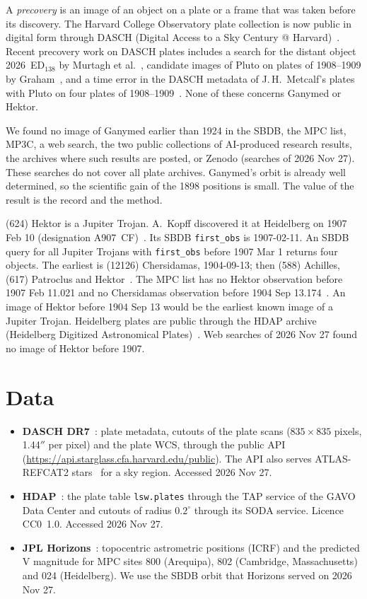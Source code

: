 \documentclass[11pt]{article}
\newcommand{\as}{$''$}
\begin{document}
A \emph{precovery} is an image of an object on a plate or a frame that was taken before its discovery. The Harvard College Observatory plate collection is now public in digital form through DASCH (Digital Access to a Sky Century @ Harvard)~\cite{grindlay2012,dasch}. Recent precovery work on DASCH plates includes a search for the distant object 2026~ED$_{138}$ by Murtagh et al.~\cite{murtagh2026}, candidate images of Pluto on plates of 1908--1909 by Graham~\cite{graham2026}, and a time error in the DASCH metadata of J.\,H.~Metcalf's plates with Pluto on four plates of 1908--1909~\cite{wu2026metcalf}. None of these concerns Ganymed or Hektor.

We found no image of Ganymed earlier than 1924 in the SBDB, the MPC list, MP3C, a web search, the two public collections of AI-produced research results, the archives where such results are posted, or Zenodo (searches of 2026 Nov 27). These searches do not cover all plate archives. Ganymed's orbit is already well determined, so the scientific gain of the 1898 positions is small. The value of the result is the record and the method.

(624) Hektor is a Jupiter Trojan. A.~Kopff discovered it at Heidelberg on 1907 Feb 10 (designation A907~CF)~\cite{sbdb}. Its SBDB \texttt{first\_obs} is 1907-02-11. An SBDB query for all Jupiter Trojans with \texttt{first\_obs} before 1907 Mar 1 returns four objects. The earliest is (12126) Chersidamas, 1904-09-13; then (588) Achilles, (617) Patroclus and Hektor~\cite{sbdb}. The MPC list has no Hektor observation before 1907 Feb 11.021 and no Chersidamas observation before 1904 Sep 13.174~\cite{mpcobs}. An image of Hektor before 1904 Sep 13 would be the earliest known image of a Jupiter Trojan. Heidelberg plates are public through the HDAP archive (Heidelberg Digitized Astronomical Plates)~\cite{hdap}. Web searches of 2026 Nov 27 found no image of Hektor before 1907.

\section{Data}
\begin{itemize}
\item \textbf{DASCH DR7}~\cite{dasch}: plate metadata, cutouts of the plate scans ($835\times835$ pixels, 1.44\as{} per pixel) and the plate WCS, through the public API (\url{https://api.starglass.cfa.harvard.edu/public}). The API also serves ATLAS-REFCAT2 stars~\cite{tonry2018} for a sky region. Accessed 2026 Nov 27.
\item \textbf{HDAP}~\cite{hdap}: the plate table \texttt{lsw.plates} through the TAP service of the GAVO Data Center and cutouts of radius $0.2^\circ$ through its SODA service. Licence CC0~1.0. Accessed 2026 Nov 27.
\item \textbf{JPL Horizons}~\cite{horizons}: topocentric astrometric positions (ICRF) and the predicted V magnitude for MPC sites 800 (Arequipa), 802 (Cambridge, Massachusetts) and 024 (Heidelberg). We use the SBDB orbit that Horizons served on 2026 Nov 27.
\end{itemize}
\end{document}
